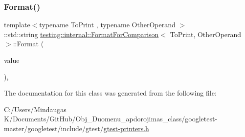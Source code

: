 \subsubsection{\texorpdfstring{Format()}{Format()}\hspace{0.1cm}{\footnotesize\ttfamily [3/3]}}
{\footnotesize\ttfamily template$<$typename To\+Print , typename Other\+Operand $>$ \\
\+::std\+::string \mbox{\hyperlink{classtesting_1_1internal_1_1_format_for_comparison}{testing\+::internal\+::\+Format\+For\+Comparison}}$<$ To\+Print, Other\+Operand $>$\+::Format (\begin{DoxyParamCaption}\item[{const To\+Print \&}]{value }\end{DoxyParamCaption})\hspace{0.3cm}{\ttfamily [inline]}, {\ttfamily [static]}}



The documentation for this class was generated from the following file\+:\begin{DoxyCompactItemize}
\item 
C\+:/\+Users/\+Mindaugas K/\+Documents/\+Git\+Hub/\+Obj\+\_\+\+Duomenu\+\_\+apdorojimas\+\_\+class/googletest-\/master/googletest/include/gtest/\mbox{\hyperlink{googletest-master_2googletest_2include_2gtest_2gtest-printers_8h}{gtest-\/printers.\+h}}\end{DoxyCompactItemize}
